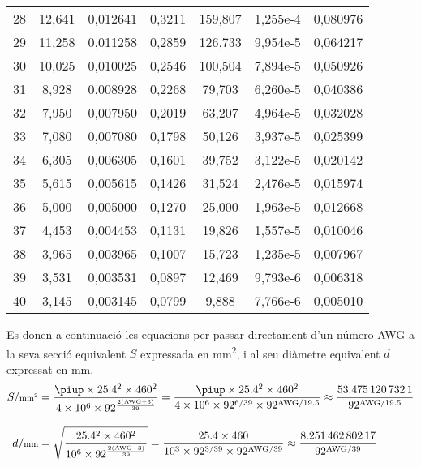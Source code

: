 \begin{longtable}{S[table-format=4.0]S[table-format=3.3]
                  S[table-format=2.6]S[table-format=2.4]
                  S[table-format=6.3]S[table-format=1.3e1]
                  S[table-format=3.6]}
28 &     12,641 &   0,012641 &     0,3211 &    159,807 &  1,255e-4 &   0,080976 \\
29 &     11,258 &   0,011258 &     0,2859 &    126,733 &  9,954e-5 &   0,064217 \\
30 &     10,025 &   0,010025 &     0,2546 &    100,504 &  7,894e-5 &   0,050926 \\
31 &      8,928 &   0,008928 &     0,2268 &     79,703 &  6,260e-5 &   0,040386 \\
32 &      7,950 &   0,007950 &     0,2019 &     63,207 &  4,964e-5 &   0,032028 \\
33 &      7,080 &   0,007080 &     0,1798 &     50,126 &  3,937e-5 &   0,025399 \\
34 &      6,305 &   0,006305 &     0,1601 &     39,752 &  3,122e-5 &   0,020142 \\
35 &      5,615 &   0,005615 &     0,1426 &     31,524 &  2,476e-5 &   0,015974 \\
36 &      5,000 &   0,005000 &     0,1270 &     25,000 &  1,963e-5 &   0,012668 \\
37 &      4,453 &   0,004453 &     0,1131 &     19,826 &  1,557e-5 &   0,010046 \\
38 &      3,965 &   0,003965 &     0,1007 &     15,723 &  1,235e-5 &   0,007967 \\
39 &      3,531 &   0,003531 &     0,0897 &     12,469 &  9,793e-6 &   0,006318 \\
40 &      3,145 &   0,003145 &     0,0799 &      9,888 &  7,766e-6 &   0,005010 \\
\bottomrule[1pt]
\end{longtable}

 Es donen a continuació les equacions per passar directament d'un número AWG a la seva secció equivalent $S$  expressada en \unit{mm^2}, i al seu diàmetre equivalent $d$  expressat en \unit{mm}.
\begin{align}
   S/{\scriptstyle\unit{mm^2}}  &= \frac{ \piup \times \num{25,4}^2 \times 460^2}{4 \times 10^6 \times 92^{\frac{2(\text{AWG}+3)}{39}}} =
   \frac{ \piup \times \num{25,4}^2 \times 460^2}{4 \times 10^6 \times 92^{6/39} \times 92^{\text{AWG}/\num{19,5}}} \approx
   \frac{\num{53,4751207321}}{92^{\text{AWG}/\num{19,5}}}\label{eq:awg_mm2}\\[2ex]
   d/{\scriptstyle\unit{mm}}  &= \sqrt{\frac{\num{25,4}^2 \times 460^2}{10^6 \times 92^{\frac{2(\text{AWG}+3)}{39}}}} =
   \frac{\num{25,4} \times 460}{10^3 \times 92^{3/39} \times 92^{\text{AWG}/39}} \approx
   \frac{\num{8,25146280217}}{92^{\text{AWG}/39}}\label{eq:awg_mm}
\end{align}

